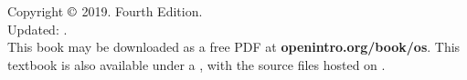 \chapter*{}
\vfill

\noindent%
Copyright $\copyright$ 2019. Fourth Edition. \\
Updated: \versiondate. \\

\noindent%
This book may be downloaded as a free PDF at
    {\color{black}\textbf{openintro.org/book/os}}.
This textbook is also available under a
,
with the source files hosted on
. \\

\printlocation


